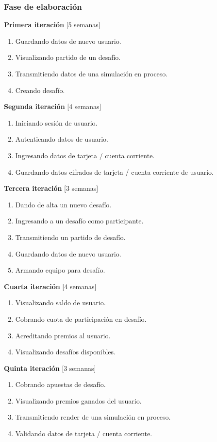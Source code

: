\documentclass[a4paper, 10pt, twoside]{article}
\begin{document}
\subsubsection{Fase de elaboración}

\textbf{Primera iteración} [5 semanas]
\begin{enumerate}
\item Guardando datos de nuevo usuario.
\item Visualizando partido de un desafío.
\item Transmitiendo datos de una simulación en proceso.
\item Creando desafío.
\end{enumerate}

\textbf{Segunda iteración} [4 semanas]
\begin{enumerate}
\item Iniciando sesión de usuario.
\item Autenticando datos de usuario.
\item Ingresando datos de tarjeta / cuenta corriente.
\item Guardando datos cifrados de tarjeta / cuenta corriente de usuario.
\end{enumerate}

\textbf{Tercera iteración} [3 semanas]
\begin{enumerate}
\item Dando de alta un nuevo desafío.
\item Ingresando a un desafío como participante.
\item Transmitiendo un partido de desafío.
\item Guardando datos de nuevo usuario.
\item Armando equipo para desafío.
\end{enumerate}

\textbf{Cuarta iteración} [4 semanas]
\begin{enumerate}
\item Visualizando saldo de usuario.
\item Cobrando cuota de participación en desafío.
\item Acreditando premios al usuario.
\item Visualizando desafíos disponibles.
\end{enumerate}

\textbf{Quinta iteración} [3 semanas]
\begin{enumerate}
\item Cobrando apuestas de desafío.
\item Visualizando premios ganados del usuario.
\item Transmitiendo render de una simulación en proceso.
\item Validando datos de tarjeta / cuenta corriente.
\end{enumerate}
\end{document}
